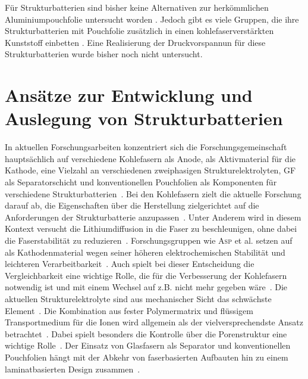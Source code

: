 Für Strukturbatterien sind bisher keine Alternativen zur herkömmlichen Aluminiumpouchfolie untersucht worden \cite{Ye2024}. Jedoch gibt es viele Gruppen, die ihre Strukturbatterien mit Pouchfolie zusätzlich in einen kohlefaserverstärkten Kunststoff einbetten \cite{Pattarakunnan2020,Asp2021}. Eine Realisierung der Druckvorspannun für diese Strukturbatterien wurde bisher noch nicht untersucht.

\section{Ansätze zur Entwicklung und Auslegung von Strukturbatterien}

In aktuellen Forschungsarbeiten konzentriert sich die Forschungsgemeinschaft hauptsächlich auf verschiedene Kohlefasern als Anode,  als Aktivmaterial für die Kathode, eine Vielzahl an verschiedenen zweiphasigen Strukturelektrolyten, GF als Separatorschicht und konventionellen Pouchfolien als Komponenten für verschiedene Strukturbatterien~\cite{Asp2021,Jin2023, Asp2024,Chaudhary2024}. Bei den Kohlefasern zielt die aktuelle Forschung darauf ab, die Eigenschaften über die Herstellung zielgerichtet auf die Anforderungen der Strukturbatterie anzupassen~\cite{Asp2024}. Unter Anderem wird in diesem Kontext versucht die Lithiumdiffusion in die Faser zu beschleunigen, ohne dabei die Faserstabilität zu reduzieren~\cite{Duan2021,Larsson2023,Johansen2024,Asp2024}. Forschungsgruppen wie \textsc{Asp} et al. setzen auf  als Kathodenmaterial wegen seiner höheren elektrochemischen Stabilität und leichteren Verarbeitbarkeit~\cite{Asp2021, Siraj2023, Ye2024, Chaudhary2024}. Auch spielt bei dieser Entscheidung die Vergleichbarkeit eine wichtige Rolle, die für die Verbesserung der Kohlefasern notwendig ist und mit einem Wechsel auf z.B.  nicht mehr gegeben wäre~\cite{Asp2024}. Die aktuellen Strukturelektrolyte sind aus mechanischer Sicht das schwächste Element~\cite{Lee2019,Jin2023}. Die Kombination aus fester Polymermatrix und flüssigem Transportmedium für die Ionen wird allgemein als der vielversprechendste Ansatz betrachtet~\cite{Lee2019,Asp2021, Greenhalgh2023}. Dabei spielt besonders die Kontrolle über die Porenstruktur eine wichtige Rolle~\cite{Lee2019}. Der Einsatz von Glasfasern als Separator und konventionellen Pouchfolien hängt mit der Abkehr von faserbasierten Aufbauten hin zu einem laminatbasierten Design zusammen~\cite{Zhao2020,Xu2022}.


